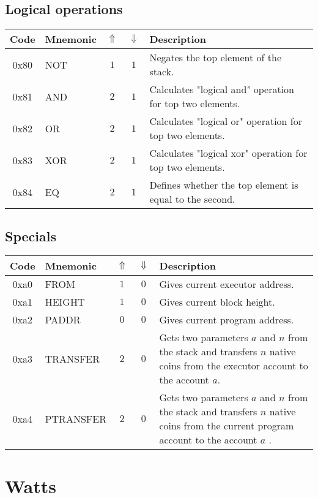 \documentclass[12pt,a4paper]{article}
\begin{document}
\subsection{Logical operations}
\begin{tabularx}{\textwidth}{ c l c c p{7cm} }
\textbf{Code} & \textbf{Mnemonic} & \textbf{$\Uparrow$} & \textbf{$\Downarrow$} & \textbf{Description} \\
\hline
0x80 & NOT & $1$ & $1$ & Negates the top element of the stack. \\
\hline
0x81 & AND & $2$ & $1$ & Calculates "logical and" operation for top two elements. \\
\hline
0x82 & OR & $2$ & $1$ & Calculates "logical or" operation for top two elements. \\
\hline
0x83 & XOR & $2$ & $1$ & Calculates "logical xor" operation for top two elements. \\
\hline
0x84 & EQ & $2$ & $1$ & Defines whether the top element is equal to the second. \\
\hline
\end{tabularx}

\subsection{Specials}
\begin{tabularx}{\textwidth}{ c l c c p{7cm} }
\textbf{Code} & \textbf{Mnemonic} & \textbf{$\Uparrow$} & \textbf{$\Downarrow$} & \textbf{Description} \\
\hline
0xa0 & FROM & $1$ & $0$ & Gives current executor address. \\
\hline
0xa1 & HEIGHT & $1$ & $0$ & Gives current block height. \\
\hline
0xa2 & PADDR & $0$ & $0$ & Gives current program address. \\
\hline
0xa3 & TRANSFER & $2$ & $0$ & Gets two parameters $a$ and $n$ from the stack and transfers $n$ native coins from the executor account to the account $a$. \\
\hline
0xa4 & PTRANSFER & $2$ & $0$ & Gets two parameters $a$ and $n$ from the stack and transfers $n$ native coins from the current program account to the account $a$ . \\
\hline

\end{tabularx}

\section{Watts}
\end{document}
